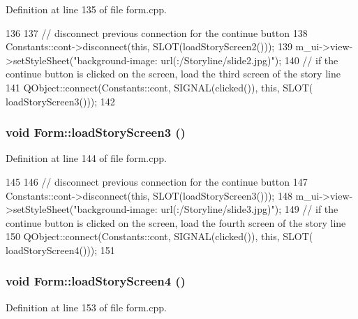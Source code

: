 Definition at line 135 of file form.cpp.


\begin{DoxyCode}
136 {
137     // disconnect previous connection for the continue button
138     Constants::cont->disconnect(this, SLOT(loadStoryScreen2()));
139     m_ui->view->setStyleSheet("background-image: url(:/Storyline/slide2.jpg)");
140     // if the continue button is clicked on the screen, load the third screen of 
      the story line
141     QObject::connect(Constants::cont, SIGNAL(clicked()), this, SLOT(
      loadStoryScreen3()));
142 }
\end{DoxyCode}
\hypertarget{class_form_a2c466a1ae32e4a9c45b2d285ae7abca8}{
\subsubsection[{loadStoryScreen3}]{\setlength{\rightskip}{0pt plus 5cm}void Form::loadStoryScreen3 ()}}
\label{class_form_a2c466a1ae32e4a9c45b2d285ae7abca8}


Definition at line 144 of file form.cpp.


\begin{DoxyCode}
145 {
146     // disconnect previous connection for the continue button
147     Constants::cont->disconnect(this, SLOT(loadStoryScreen3()));
148     m_ui->view->setStyleSheet("background-image: url(:/Storyline/slide3.jpg)");
149     // if the continue button is clicked on the screen, load the fourth screen of
       the story line
150     QObject::connect(Constants::cont, SIGNAL(clicked()), this, SLOT(
      loadStoryScreen4()));
151 }
\end{DoxyCode}
\hypertarget{class_form_aaa5e8fc86af7da56f82ef3ea178ca5b3}{
\subsubsection[{loadStoryScreen4}]{\setlength{\rightskip}{0pt plus 5cm}void Form::loadStoryScreen4 ()}}
\label{class_form_aaa5e8fc86af7da56f82ef3ea178ca5b3}


Definition at line 153 of file form.cpp.


